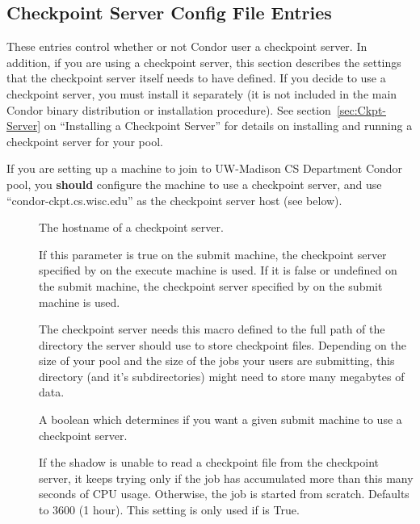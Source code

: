 \subsection{\label{sec:Checkpoint-Server-Config-File-Entries}
Checkpoint Server Config File Entries}

These entries control whether or not Condor user a checkpoint server.
In addition, if you are using a checkpoint server, this section
describes the settings that the checkpoint server itself needs to have
defined.  If you decide to use a checkpoint server, you must install
it separately (it is not included in the main Condor binary
distribution or installation procedure).  See
section~\ref{sec:Ckpt-Server} on ``Installing a Checkpoint Server''
for details on installing and running a checkpoint server for your
pool.

\Note If you are setting up a machine to join to UW-Madison CS
Department Condor pool, you \textbf{should} configure the machine to
use a checkpoint server, and use ``condor-ckpt.cs.wisc.edu'' as the
checkpoint server host (see below).

\begin{description}
  
\item[] \label{param:CkptServerHost} The
  hostname of a checkpoint server.

\item[]
  \label{param:StarterChoosesCkptServer} If this parameter is true on
  the submit machine, the checkpoint server specified by
   on the execute machine is used.  If it is
  false or undefined on the submit machine, the checkpoint server
  specified by  on the submit machine is
  used.
  
\item[] \label{param:CkptServerDir} The
  checkpoint server needs this macro defined to the full path of the
  directory the server should use to store checkpoint files.
  Depending on the size of your pool and the size of the jobs your
  users are submitting, this directory (and it's subdirectories) might
  need to store many megabytes of data.

\item[] \label{param:UseCkptServer} A boolean
  which determines if you want a given submit machine to use a
  checkpoint server.

\item[]
  \label{param:MaxDiscardedRunTime} If the shadow is unable to read a
  checkpoint file from the checkpoint server, it keeps trying only if
  the job has accumulated more than this many seconds of CPU usage.
  Otherwise, the job is started from scratch.  Defaults to 3600 (1
  hour). This setting is only used if  is
  True.

\end{description}


